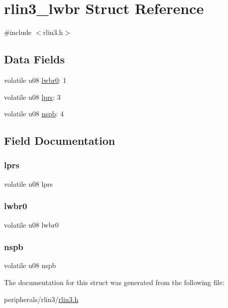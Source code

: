 \hypertarget{structrlin3__lwbr}{}\section{rlin3\+\_\+lwbr Struct Reference}
\label{structrlin3__lwbr}


{\ttfamily \#include $<$rlin3.\+h$>$}

\subsection*{Data Fields}
\begin{DoxyCompactItemize}
\item 
volatile u08 \mbox{\hyperlink{structrlin3__lwbr_ade337bf3a719cb3cf35cee49f9916705}{lwbr0}}\+: 1
\item 
volatile u08 \mbox{\hyperlink{structrlin3__lwbr_a33a7164b4189ff05b6828947d49e8732}{lprs}}\+: 3
\item 
volatile u08 \mbox{\hyperlink{structrlin3__lwbr_a9b061144d70257e9b9e2977aa2d85196}{nspb}}\+: 4
\end{DoxyCompactItemize}


\subsection{Field Documentation}
\mbox{\label{structrlin3__lwbr_a33a7164b4189ff05b6828947d49e8732}} 
\subsubsection{\texorpdfstring{lprs}{lprs}}
{\footnotesize\ttfamily volatile u08 lprs}

\mbox{\label{structrlin3__lwbr_ade337bf3a719cb3cf35cee49f9916705}} 
\subsubsection{\texorpdfstring{lwbr0}{lwbr0}}
{\footnotesize\ttfamily volatile u08 lwbr0}

\mbox{\label{structrlin3__lwbr_a9b061144d70257e9b9e2977aa2d85196}} 
\subsubsection{\texorpdfstring{nspb}{nspb}}
{\footnotesize\ttfamily volatile u08 nspb}



The documentation for this struct was generated from the following file\+:\begin{DoxyCompactItemize}
\item 
peripherals/rlin3/\mbox{\hyperlink{rlin3_8h}{rlin3.\+h}}\end{DoxyCompactItemize}
